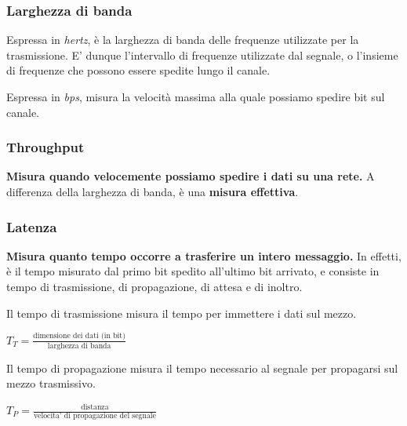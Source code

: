         \subsubsection{Larghezza di banda}
        
            Espressa in \textit{hertz}, è la larghezza di banda delle frequenze utilizzate per la trasmissione. E' dunque l'intervallo di frequenze utilizzate dal segnale, o l'insieme di frequenze che possono essere spedite lungo il canale.
            
            Espressa in \textit{bps}, misura la velocità massima alla quale possiamo spedire bit sul canale.
            
        \subsubsection{Throughput}
        
            \textbf{Misura quando velocemente possiamo spedire i dati su una rete.} A differenza della larghezza di banda, è una \textbf{misura effettiva}.
            
        \subsubsection{Latenza}
        
            \textbf{Misura quanto tempo occorre a trasferire un intero messaggio.} In effetti, è il tempo misurato dal primo bit spedito  all'ultimo bit arrivato, e consiste in tempo di trasmissione, di propagazione, di attesa e di inoltro.
            
            \vspace{3mm}
            
            Il tempo di trasmissione misura il tempo per immettere i dati sul mezzo.
            
            \begin{center}
                \(T_T = \frac{\text{dimensione dei dati (in bit)}}{\text{larghezza di banda}}\)
            \end{center}
            
            Il tempo di propagazione misura il tempo necessario al segnale per propagarsi sul mezzo trasmissivo.
            
            \begin{center}
                \(T_P = \frac{\text{distanza}}{\text{velocita' di propagazione del segnale}}\)
            \end{center}
            
